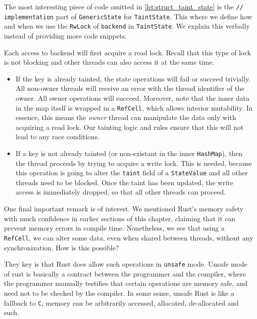 The most interesting piece of code omitted in \ref{lst:struct_taint_state} is the \texttt{//
implementation} part of \texttt{GenericState} for \texttt{TaintState}. This where we define how and
when we use the \texttt{RwLock} of \texttt{backend} in \texttt{TaintState}. We explain this verbally
instead of providing more code snippets.

Each access to backend will first acquire a read lock. Recall that this type of lock is not blocking
and other threads can also access it at the same time.

\begin{itemize}
	\item If the key is already tainted, the state operations will fail or succeed trivially. All
	non-owner threads will receive an error with the thread identifier of the owner. All owner
	operations will succeed. Moreover, note that the inner data in the map itself is wrapped in a
	\texttt{RefCell}, which allows interior mutability\cite{RefCellInteriorMutability}. In essence,
	this means the \textit{owner} thread can manipulate the data only with acquiring a read lock.
	Our tainting logic and rules ensure that this will not lead to any race conditions.
	\item If a key is not already tainted (or non-existant in the inner \texttt{HashMap}), then the
	thread proceeds by trying to acquire a write lock. This is needed, because this operation is
	going to alter the \texttt{taint} field of a \texttt{StateValue} and all other threads need to
	be blocked. Once the taint has been updated, the write access is immediately dropped, so that
	all other threads can proceed.
\end{itemize}

One final important remark is of interest. We mentioned Rust's memory safety with much confidence in
earlier sections of this chapter, claiming that it can prevent memory errors in compile time.
Nonetheless, we see that using a \texttt{RefCell}, we can alter some data, even when shared between
threads, without any synchronization. How is this possible?

They key is that Rust does allow such operations in \texttt{unsafe} mode. Unsafe mode of rust is
basically a contract between the programmer and the compiler, where the programmer manually
testifies that certain operations are memory safe, and need not to be checked by the compiler. In
some sense, unsafe Rust is like a fallback to \texttt{C}, memory can be arbitrarily accessed,
allocated, de-allocated and such.

